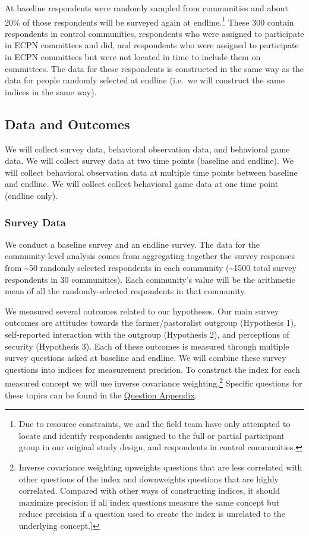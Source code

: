 \documentclass[
]{article}
\begin{document}
At baseline respondents were randomly sampled from communities and about
20\% of those respondents will be surveyed again at endline.\footnote{Due
  to resource constraints, we and the field team have only attempted to
  locate and identify respondents assigned to the full or partial
  participant group in our original study design, and respondents in
  control communities.} These 300 contain respondents in control
communities, respondents who were assigned to participate in ECPN
committees and did, and respondents who were assigned to participate in
ECPN committees but were not located in time to include them on
committees. The data for these respondents is constructed in the same
way as the data for people randomly selected at endline (i.e.~we will
construct the same indices in the same way).

\hypertarget{data-and-outcomes}{%
\subsection{Data and Outcomes}\label{data-and-outcomes}}

We will collect survey data, behavioral observation data, and behavioral
game data. We will collect survey data at two time points (baseline and
endline). We will collect behavioral observation data at multiple time
points between baseline and endline. We will collect collect behavioral
game data at one time point (endline only).

\hypertarget{survey-data}{%
\subsubsection{Survey Data}\label{survey-data}}

We conduct a baseline survey and an endline survey. The data for the
community-level analysis comes from aggregating together the survey
responses from \textasciitilde50 randomly selected respondents in each
community (\textasciitilde1500 total survey respondents in 30
communities). Each community's value will be the arithmetic mean of all
the randomly-selected respondents in that community.

We measured several outcomes related to our hypotheses. Our main survey
outcomes are attitudes towards the farmer/pastoralist outgroup
(Hypothesis 1), self-reported interaction with the outgroup (Hypothesis
2), and perceptions of security (Hypothesis 3). Each of these outcomes
is measured through multiple survey questions asked at baseline and
endline. We will combine these survey questions into indices for
measurement precision. To construct the index for each measured concept
we will use inverse covariance weighting.\footnote{Inverse covariance
  weighting upweights questions that are less correlated with other
  questions of the index and downweights questions that are highly
  correlated. Compared with other ways of constructing indices, it
  should maximize precision if all index questions measure the same
  concept but reduce precision if a question used to create the index is
  unrelated to the underlying concept.{]}} Specific questions for these
topics can be found in the \protect\hyperlink{questions}{Question
Appendix}.
\end{document}

